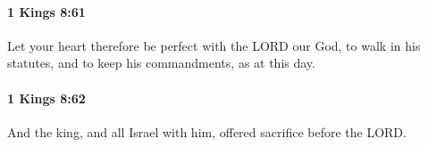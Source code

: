 		\paragraph{1 Kings 8:61} %
			\label{1KINGS-8-61}

			Let your heart therefore be perfect with the LORD our God, to walk in his statutes, and to keep his commandments, as at this day.


		\paragraph{1 Kings 8:62} %
			\label{1KINGS-8-62}

			And the king, and all Israel with him, offered sacrifice before the LORD.


